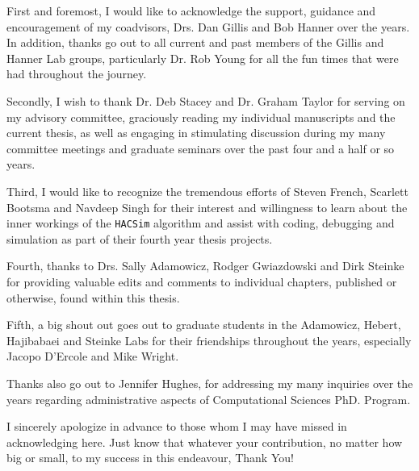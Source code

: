 \begin{acknowledgements}\label{acknow}
\ssp

\noindent First and foremost, I would like to acknowledge the support, guidance and encouragement of my coadvisors, Drs. Dan Gillis and Bob Hanner over the years. In addition, thanks go out to all current and past members of the Gillis and Hanner Lab groups, particularly Dr. Rob Young for all the fun times that were had throughout the journey.

\vspace{5mm}

\noindent Secondly, I wish to thank Dr. Deb Stacey and Dr. Graham Taylor for serving on my advisory committee, graciously reading my individual manuscripts and the current thesis, as well as engaging in stimulating discussion during my many committee meetings and graduate seminars over the past four and a half or so years.

\vspace{5mm}

\noindent Third, I would like to recognize the tremendous efforts of Steven French, Scarlett Bootsma and Navdeep Singh for their interest and willingness to learn about the inner workings of the {\tt HACSim} algorithm and assist with coding, debugging and simulation as part of their fourth year thesis projects.

\vspace{5mm}

\noindent Fourth, thanks to Drs. Sally Adamowicz, Rodger Gwiazdowski and Dirk Steinke for providing valuable edits and comments to individual chapters, published or otherwise, found within this thesis.

\vspace{5mm}

\noindent Fifth, a big shout out goes out to graduate students in the Adamowicz, Hebert, Hajibabaei and Steinke Labs for their friendships throughout the years, especially Jacopo D'Ercole and Mike Wright.

\vspace{5mm}

\noindent Thanks also go out to Jennifer Hughes, for addressing my many inquiries over the years regarding administrative aspects of Computational Sciences PhD. Program.

\vspace{5mm}

\noindent I sincerely apologize in advance to those whom I may have missed in acknowledging here. Just know that whatever your contribution, no matter how big or small, to my success in this endeavour, Thank You!


\end{acknowledgements}
